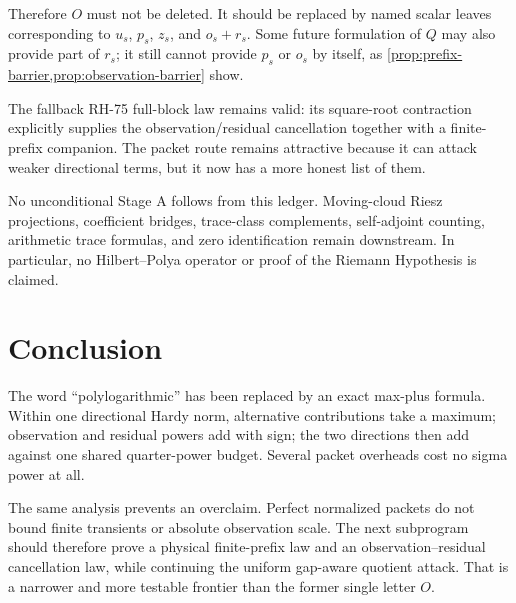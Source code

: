\documentclass[11pt]{article}
\theoremstyle{definition}
\theoremstyle{remark}
\begin{document}
Therefore $O$ must not be deleted.  It should be replaced by named scalar
leaves corresponding to $u_s$, $p_s$, $z_s$, and $o_s+r_s$.  Some future
formulation of $Q$ may also provide part of $r_s$; it still cannot provide
$p_s$ or $o_s$ by itself, as \cref{prop:prefix-barrier,prop:observation-barrier}
show.

The fallback RH-75 full-block law remains valid: its square-root contraction
explicitly supplies the observation/residual cancellation together with a
finite-prefix companion.  The packet route remains attractive because it can
attack weaker directional terms, but it now has a more honest list of them.

No unconditional Stage A follows from this ledger.  Moving-cloud Riesz
projections, coefficient bridges, trace-class complements, self-adjoint
counting, arithmetic trace formulas, and zero identification remain
downstream.  In particular, no Hilbert--Polya operator or proof of the
Riemann Hypothesis is claimed.

\section{Conclusion}

The word ``polylogarithmic'' has been replaced by an exact max-plus formula.
Within one directional Hardy norm, alternative contributions take a maximum;
observation and residual powers add with sign; the two directions then add
against one shared quarter-power budget.  Several packet overheads cost no
sigma power at all.

The same analysis prevents an overclaim.  Perfect normalized packets do not
bound finite transients or absolute observation scale.  The next subprogram
should therefore prove a physical finite-prefix law and an
observation--residual cancellation law, while continuing the uniform
gap-aware quotient attack.  That is a narrower and more testable frontier
than the former single letter $O$.



\end{document}
